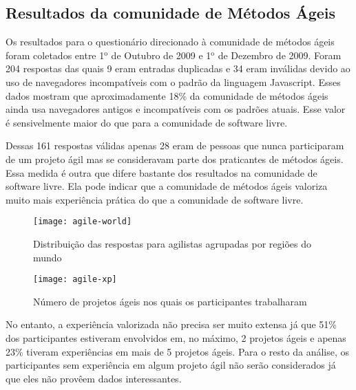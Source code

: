 \subsection{Resultados da comunidade de Métodos Ágeis}
\label{sec:resp-agile}

Os resultados para o questionário direcionado à comunidade de métodos
ágeis foram coletados entre 1$^{\textrm{o}}$ de Outubro de 2009 e
1$^{\textrm{o}}$ de Dezembro de 2009. Foram 204 respostas das quais 9
eram entradas duplicadas e 34 eram inválidas devido ao uso de
navegadores incompatíveis com o padrão da linguagem Javascript. Esses
dados mostram que aproximadamente 18\% da comunidade de métodos ágeis
ainda usa navegadores antigos e incompatíveis com os padrões
atuais. Esse valor é sensivelmente maior do que para a comunidade de
software livre.

Dessas 161 respostas válidas apenas 28 eram de pessoas que nunca
participaram de um projeto ágil mas se consideravam parte dos
praticantes de métodos ágeis. Essa medida é outra que difere bastante
dos resultados na comunidade de software livre. Ela pode indicar que a
comunidade de métodos ágeis valoriza muito mais experiência prática do
que a comunidade de software livre.


\begin{figure}[htb]
  \begin{minipage}[t]{0.45\linewidth}
    \centering
    \texttt{[image: agile-world]}
    \caption{Distribuição das respostas para agilistas agrupadas por
      regiões do mundo}
    \label{fig:agile-world}
  \end{minipage}
  \begin{minipage}[t]{0.55\linewidth}
    \centering
    \texttt{[image: agile-xp]}
    \caption{Número de projetos ágeis nos quais os participantes
      trabalharam}
    \label{fig:agile-xp}
  \end{minipage}
\end{figure}

No entanto, a experiência valorizada não precisa ser muito extensa já
que 51\% dos participantes estiveram envolvidos em, no máximo, 2
projetos ágeis e apenas 23\% tiveram experiências em mais de 5
projetos ágeis.  Para o resto da análise, os participantes sem
experiência em algum projeto ágil não serão considerados já que eles
não provêem dados interessantes.


